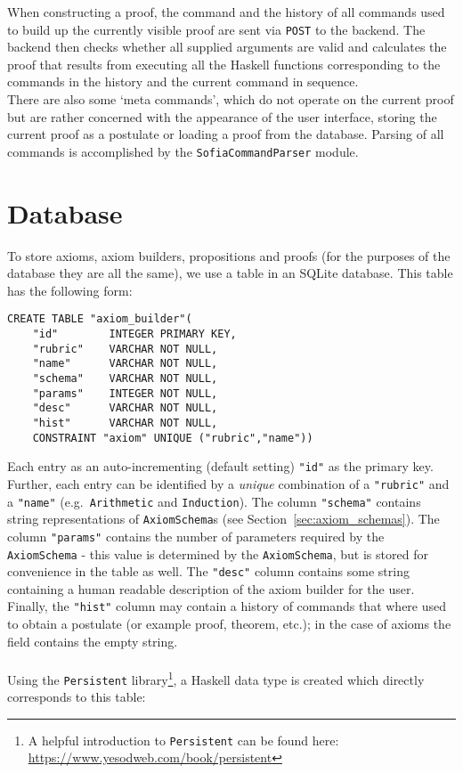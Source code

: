 \documentclass[notitlepage]{report}
\newcommand\m[1]{\texttt{#1}}
\newcommand\ms[1]{\texttt{#1}}
\begin{document}
When constructing a proof, the command and the history of all commands used to
build up the currently visible proof are sent via \texttt{POST} to the backend.
The backend then checks whether all supplied arguments are valid and calculates
the proof that results from executing all the Haskell functions corresponding to
the commands in the history and the current command in sequence.
\\
There are also some `meta commands', which do not operate on the current proof
but are rather concerned with the appearance of the user interface, storing the
current proof as a postulate or loading a proof from the database. Parsing of
all commands is accomplished by the \m{SofiaCommandParser} module.

\section{Database}
To store axioms, axiom builders, propositions and proofs (for the purposes of
the database they are all the same), we use a table in an SQLite database. This
table has the following form:

\begin{verbatim}
CREATE TABLE "axiom_builder"(
    "id"        INTEGER PRIMARY KEY,
    "rubric"    VARCHAR NOT NULL,
    "name"      VARCHAR NOT NULL,
    "schema"    VARCHAR NOT NULL,
    "params"    INTEGER NOT NULL,
    "desc"      VARCHAR NOT NULL,
    "hist"      VARCHAR NOT NULL,
    CONSTRAINT "axiom" UNIQUE ("rubric","name"))
\end{verbatim}

Each entry as an auto-incrementing (default setting) \ms{"id"} as the primary
key. Further, each entry can be identified by a \emph{unique} combination of a
\ms{"rubric"} and a \ms{"name"} (e.g.\ \texttt{Arithmetic} and
\texttt{Induction}). The column \ms{"schema"} contains string representations of
\m{AxiomSchema}s (see Section~\ref{sec:axiom_schemas}). The column \ms{"params"}
contains the number of parameters required by the \m{AxiomSchema} - this value
is determined by the \m{AxiomSchema}, but is stored for convenience in the table
as well. The \ms{"desc"} column contains some string containing a human readable
description of the axiom builder for the user. Finally, the \ms{"hist"} column
may contain a history of commands that where used to obtain a postulate (or
example proof, theorem, etc.); in the case of axioms the field contains the
empty string.\\\\
Using the \texttt{Persistent} library\footnote{A helpful introduction to
\texttt{Persistent} can be found here:
\url{https://www.yesodweb.com/book/persistent}}, a Haskell data type is created
which directly corresponds to this table:
\end{document}
